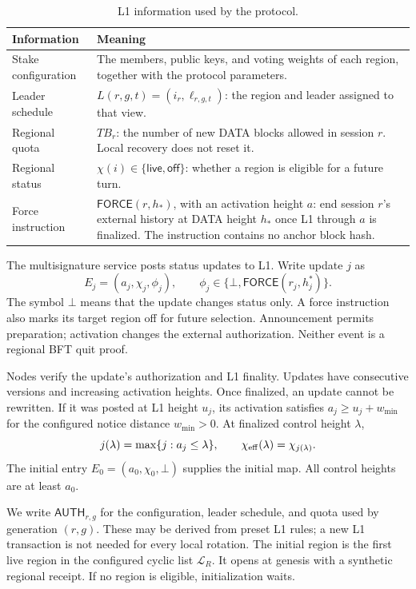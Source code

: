 \documentclass[11pt,a4paper]{article}
\newcommand{\tagg}[1]{\ensuremath{\mathsf{#1}}}
\newcounter{protocol}
\begin{document}
\begin{table}[htbp]\centering\small
\caption{L1 information used by the protocol.}
\label{tab:l1}
\begin{tabularx}{\linewidth}{@{}p{.25\linewidth}Y@{}}
\toprule
Information & Meaning\\
\midrule
Stake configuration & The members, public keys, and voting weights of
each region, together with the protocol parameters.\\
Leader schedule & $L(r,g,t)=(i_r,\ell_{r,g,t})$: the region and leader
assigned to that view.\\
Regional quota & $TB_r$: the number of new DATA blocks allowed in
session $r$. Local recovery does not reset it.\\
Regional status & $\chi(i)\in\{\tagg{live},\tagg{off}\}$: whether a region
is eligible for a future turn.\\
Force instruction & $\tagg{FORCE}(r,h_*)$, with an activation height
$a$: end session $r$'s external history at DATA height $h_*$ once L1
through $a$ is finalized. The instruction contains no anchor block hash.\\
\bottomrule
\end{tabularx}
\end{table}

The multisignature service posts status updates to L1. Write update $j$ as
\[
 E_j=(a_j,\chi_j,\phi_j),\qquad
 \phi_j\in\{\bot,\tagg{FORCE}(r_j,h_j^*)\}.
\]
The symbol $\bot$ means that the update changes status only.
A force instruction also marks its target region off for future selection.
Announcement permits preparation; activation changes the external
authorization. Neither event is a regional BFT quit proof.

Nodes verify the update's authorization and L1 finality. Updates have
consecutive versions and increasing activation heights. Once finalized,
an update cannot be rewritten. If it was posted at L1 height $u_j$, its
activation satisfies $a_j\ge u_j+w_{\min}$ for the configured notice
distance $w_{\min}>0$. At finalized control height $\lambda$,
\[
 j(\lambda)=\max\{j:a_j\le\lambda\},\qquad
 \chi_{\rm eff}(\lambda)=\chi_{j(\lambda)}.
\]
The initial entry $E_0=(a_0,\chi_0,\bot)$ supplies the initial map.
All control heights are at least $a_0$.

We write $\tagg{AUTH}_{r,g}$ for the configuration, leader schedule,
and quota used by generation $(r,g)$. These may be derived from preset
L1 rules; a new L1 transaction is not needed for every local rotation.
The initial region is the first live region in the configured cyclic
list $\mathcal L_R$. It opens at genesis with a synthetic regional
receipt. If no region is eligible, initialization waits.
\end{document}
